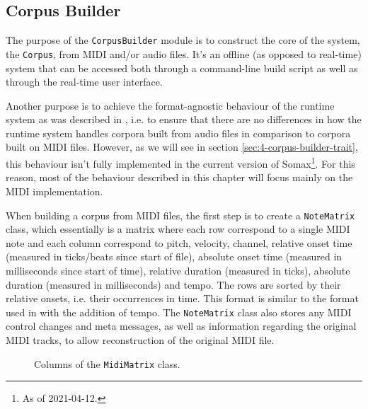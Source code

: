 \subsection{Corpus Builder}\label{sec:4-corpus-builder}
The purpose of the \texttt{CorpusBuilder} module is to construct the core of the system, the \texttt{Corpus}, from MIDI and/or audio files. It's an offline (as opposed to real-time) system that can be accessed both through a command-line build script as well as through the real-time user interface.

Another purpose is to achieve the format-agnostic behaviour of the runtime system as was described in \cite{somaxtheory2021}, i.e. to ensure that there are no differences in how the runtime system handles corpora built from audio files in comparison to corpora built on MIDI files. However, as we will see in section \ref{sec:4-corpus-builder-trait}, this behaviour isn't fully implemented in the current version of Somax\footnote{As of 2021-04-12.}. For this reason, most of the behaviour described in this chapter will focus mainly on the MIDI implementation.

When building a corpus from MIDI files, the first step is to create a \texttt{Note\-Matrix} class, which essentially is a matrix where each row correspond to a single MIDI note and each column correspond to pitch, velocity, channel, relative onset time (measured in ticks/beats since start of file), absolute onset time (measured in milliseconds since start of time), relative duration (measured in ticks), absolute duration (measured in milliseconds) and tempo. The rows are sorted by their relative onsets, i.e. their occurrences in time. This format is similar to the format used in \cite{eerola2004midi} with the addition of tempo. The \texttt{NoteMatrix} class also stores any MIDI control changes and meta messages, as well as information regarding the original MIDI tracks, to allow reconstruction of the original MIDI file.

\begin{figure}[h!]
\caption{Columns of the \texttt{MidiMatrix} class.}
\label{fig:4-note-matrix}
\end{figure}

